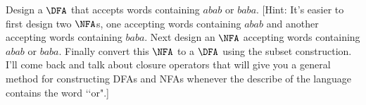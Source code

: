 Design a $\DFA$ that accepts words containing $abab$ or $baba$.
[Hint: It's easier to first design two $\NFA$s, one accepting
words containing $abab$ and another accepting words containing
$baba$.
Next design an $\NFA$ accepting words containing $abab$ or $baba$.
Finally convert this $\NFA$ to a $\DFA$ using the subset construction.
I'll come back and talk about closure operators that will give
you a general method for constructing DFAs and NFAs whenever
the describe of the language contains the word \lq\lq or".]
